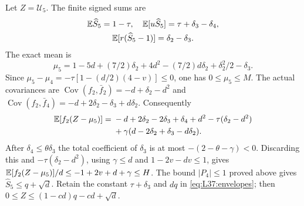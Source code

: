Let $Z=\mathcal U_5$. The finite signed sums are
\[
\begin{gathered}
\mathbb E\widehat S_5=1-\tau,\quad \mathbb E[u\widehat S_5]=\tau+\delta_3-\delta_4,\\
\mathbb E[r(\widehat S_5-1)]=\delta_2-\delta_3.
\end{gathered}
\]
The exact mean is
\[
\mu_5=1-5d+(7/2)\delta_2+4d^2-(7/2)d\delta_2
+\delta_2^2/2-\delta_3.
\]
Since $\mu_5-\mu_4=-\tau[1-(d/2)(4-v)]\le0$, one has $0\le\mu_5\le M$.
The actual covariances are
$\operatorname{Cov}(f_2,\bar f_2)=-d+\delta_2-d^2$ and
$\operatorname{Cov}(f_2,\bar f_4)=-d+2\delta_2-\delta_3+d\delta_2$.
Consequently
\[
\begin{aligned}
\mathbb E[f_2(Z-\mu_5)]={}&-d+2\delta_2-2\delta_3+\delta_4+d^2
-\tau(\delta_2-d^2)\\
&+\gamma(d-2\delta_2+\delta_3-d\delta_2).
\end{aligned}
\]
After $\delta_4\le\theta\delta_3$ the total coefficient of
$\delta_3$ is at most $-(2-\theta-\gamma)<0$.
Discarding this and $-\tau(\delta_2-d^2)$, using $\gamma\le d$ and
$1-2v-dv\le1$, gives $\mathbb E[f_2(Z-\mu_5)]/d\le-1+2v+d+\gamma\le H$.
The bound $|P_4|\le1$ proved above gives $\widehat S_5\le q+\sqrt d$.
Retain the constant $\tau+\delta_3$ and $dq$ in
\eqref{eq:L37:envelopes}; then $0\le Z\le(1-cd)q-cd+\sqrt d$.


